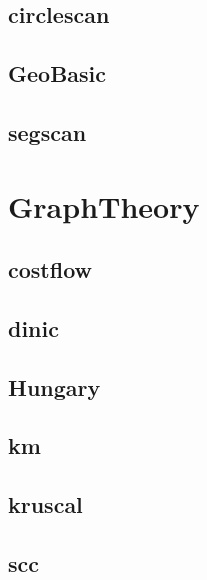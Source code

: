 \subsection{circlescan}
\raggedbottom
\hrulefill
\subsection{GeoBasic}
\raggedbottom
\hrulefill
\subsection{segscan}
\raggedbottom
\hrulefill

\section{GraphTheory}
\subsection{costflow}
\raggedbottom
\hrulefill
\subsection{dinic}
\raggedbottom
\hrulefill
\subsection{Hungary}
\raggedbottom
\hrulefill
\subsection{km}
\raggedbottom
\hrulefill
\subsection{kruscal}
\raggedbottom
\hrulefill
\subsection{scc}
\raggedbottom
\hrulefill

